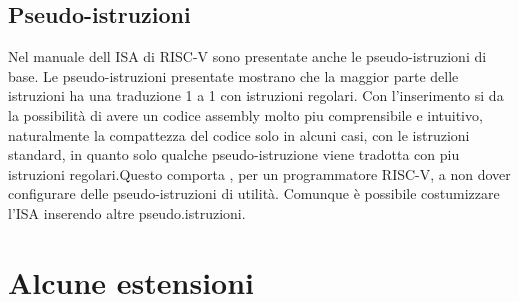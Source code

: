 \documentclass[12pt,a4paper]{report}
\begin{document}
\subsection{Pseudo-istruzioni}
Nel manuale dell ISA di RISC-V sono presentate anche le pseudo-istruzioni di base. Le pseudo-istruzioni presentate mostrano che la maggior parte delle istruzioni ha una traduzione 1 a 1 con istruzioni regolari. Con l'inserimento si da la possibilità di avere un codice assembly molto piu comprensibile e intuitivo, naturalmente la compattezza del codice solo in alcuni casi, con le istruzioni standard, in quanto solo qualche pseudo-istruzione viene tradotta con piu istruzioni regolari.Questo comporta , per un programmatore RISC-V, a non dover configurare delle pseudo-istruzioni di utilità. Comunque è possibile costumizzare l'ISA inserendo altre pseudo.istruzioni.

\section{Alcune estensioni}
\end{document}
